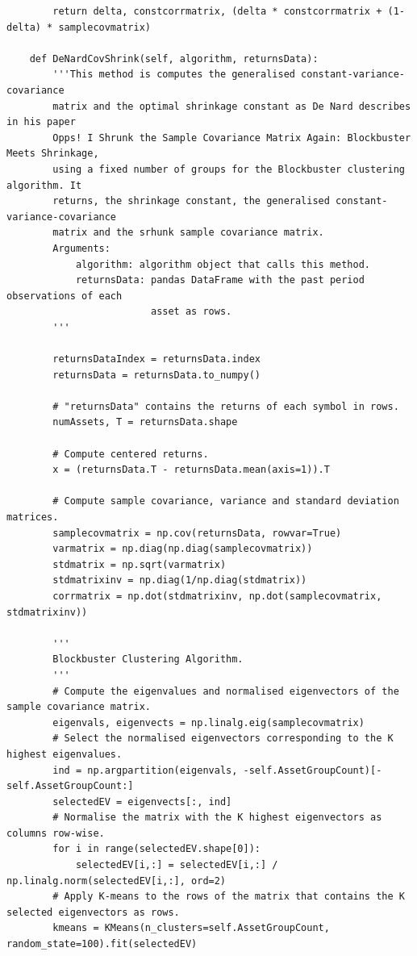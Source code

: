 \begin{verbatim}
        return delta, constcorrmatrix, (delta * constcorrmatrix + (1-delta) * samplecovmatrix)
        
    def DeNardCovShrink(self, algorithm, returnsData):
        '''This method is computes the generalised constant-variance-covariance
        matrix and the optimal shrinkage constant as De Nard describes in his paper
        Opps! I Shrunk the Sample Covariance Matrix Again: Blockbuster Meets Shrinkage,
        using a fixed number of groups for the Blockbuster clustering algorithm. It
        returns, the shrinkage constant, the generalised constant-variance-covariance
        matrix and the srhunk sample covariance matrix.
        Arguments:
            algorithm: algorithm object that calls this method.
            returnsData: pandas DataFrame with the past period observations of each
                         asset as rows.
        '''
        
        returnsDataIndex = returnsData.index
        returnsData = returnsData.to_numpy()
    
        # "returnsData" contains the returns of each symbol in rows.
        numAssets, T = returnsData.shape
    
        # Compute centered returns.
        x = (returnsData.T - returnsData.mean(axis=1)).T
    
        # Compute sample covariance, variance and standard deviation matrices.
        samplecovmatrix = np.cov(returnsData, rowvar=True)
        varmatrix = np.diag(np.diag(samplecovmatrix))
        stdmatrix = np.sqrt(varmatrix)
        stdmatrixinv = np.diag(1/np.diag(stdmatrix))
        corrmatrix = np.dot(stdmatrixinv, np.dot(samplecovmatrix, stdmatrixinv))
    
        '''
        Blockbuster Clustering Algorithm.
        '''
        # Compute the eigenvalues and normalised eigenvectors of the sample covariance matrix.
        eigenvals, eigenvects = np.linalg.eig(samplecovmatrix)
        # Select the normalised eigenvectors corresponding to the K highest eigenvalues.
        ind = np.argpartition(eigenvals, -self.AssetGroupCount)[-self.AssetGroupCount:]
        selectedEV = eigenvects[:, ind]
        # Normalise the matrix with the K highest eigenvectors as columns row-wise.
        for i in range(selectedEV.shape[0]):
            selectedEV[i,:] = selectedEV[i,:] / np.linalg.norm(selectedEV[i,:], ord=2)
        # Apply K-means to the rows of the matrix that contains the K selected eigenvectors as rows.
        kmeans = KMeans(n_clusters=self.AssetGroupCount, random_state=100).fit(selectedEV)
        

\end{verbatim}
